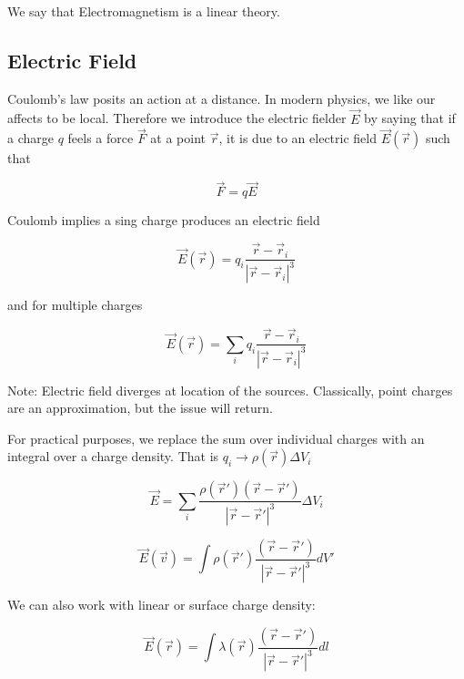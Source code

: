 We say that Electromagnetism is a linear theory.

\subsection{Electric Field}

Coulomb's law posits an action at a distance. In modern physics, we like our affects to be local. Therefore we introduce the electric fielder $\vec{E}$ by saying that if a charge $q$ feels a force $\vec{F}$ at a point $\vec{r}$, it is due to an electric field $\vec{E}(\vec{r})$ such that

\begin{equation}
\vec{F} = q \vec{E}
\end{equation}

Coulomb implies a sing charge produces an electric field

\begin{equation}
\vec{E}(\vec{r}) = q_i \frac{\vec{r} - \vec{r}_i}{| \vec{r} - \vec{r}_i |^3}
\end{equation}

and for multiple charges

\begin{equation}
\vec{E}(\vec{r}) = \sum_i q_i \frac{\vec{r} - \vec{r}_i}{| \vec{r} - \vec{r}_i |^3}
\end{equation}

Note: Electric field diverges at location of the sources. Classically, point charges are an approximation, but the issue will return.

\vspace{\baselineskip}

For practical purposes, we replace the sum over individual charges with an integral over a charge density. That is $q_i \rightarrow \rho(\vec{r}) \Delta V_i$

\begin{equation*}
\vec{E} = \sum_i \frac{\rho(\vec{r}') (\vec{r} - \vec{r}')}{| \vec{r} - \vec{r}'|^3} \Delta V_i
\end{equation*}

\begin{equation}
\vec{E} (\vec{v}) = \int \rho (\vec{r}') \frac{(\vec{r} - \vec{r}')}{| \vec{r} - \vec{r}'|^3} dV'
\end{equation}

We can also work with linear or surface charge density:

\begin{equation}
\vec{E} (\vec{r}) = \int \lambda (\vec{r}) \frac{(\vec{r} - \vec{r}')}{| \vec{r} - \vec{r}'|^3} dl
\end{equation}

